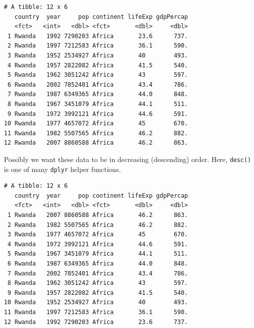 \documentclass[]{krantz}
\makeatletter
\newenvironment{Shaded}{\begin{snugshade}}{\end{snugshade}}
\newcommand{\KeywordTok}[1]{\textcolor[rgb]{0.27,0.27,0.27}{\textbf{#1}}}
\newcommand{\StringTok}[1]{\textcolor[rgb]{0.5,0.5,0.5}{#1}}
\newcommand{\OperatorTok}[1]{\textcolor[rgb]{0.43,0.43,0.43}{\textbf{#1}}}
\newcommand{\NormalTok}[1]{#1}
\newenvironment{kframe}{%
\medskip{}
\setlength{\fboxsep}{.8em}
 \def\at@end@of@kframe{}%
 \ifinner\ifhmode%
  \def\at@end@of@kframe{\end{minipage}}%
  \begin{minipage}{\columnwidth}%
 \fi\fi%
 \def\FrameCommand##1{\hskip\@totalleftmargin \hskip-\fboxsep
 \colorbox{shadecolor}{##1}\hskip-\fboxsep
     \hskip-\linewidth \hskip-\@totalleftmargin \hskip\columnwidth}%
 \MakeFramed {\advance\hsize-\width
   \@totalleftmargin\z@ \linewidth\hsize
   \@setminipage}}%
 {\par\unskip\endMakeFramed%
 \at@end@of@kframe}
\renewenvironment{Shaded}{\begin{kframe}}{\end{kframe}}
\makeatother
\begin{document}
\begin{Shaded}
\end{Shaded}

\begin{verbatim}
# A tibble: 12 x 6
   country  year     pop continent lifeExp gdpPercap
   <fct>   <int>   <dbl> <fct>       <dbl>     <dbl>
 1 Rwanda   1992 7290203 Africa       23.6      737.
 2 Rwanda   1997 7212583 Africa       36.1      590.
 3 Rwanda   1952 2534927 Africa       40        493.
 4 Rwanda   1957 2822082 Africa       41.5      540.
 5 Rwanda   1962 3051242 Africa       43        597.
 6 Rwanda   2002 7852401 Africa       43.4      786.
 7 Rwanda   1987 6349365 Africa       44.0      848.
 8 Rwanda   1967 3451079 Africa       44.1      511.
 9 Rwanda   1972 3992121 Africa       44.6      591.
10 Rwanda   1977 4657072 Africa       45        670.
11 Rwanda   1982 5507565 Africa       46.2      882.
12 Rwanda   2007 8860588 Africa       46.2      863.
\end{verbatim}

Possibly we want these data to be in decreasing (descending) order.
Here, \texttt{desc()} is one of many \texttt{dplyr} helper functions.

\begin{Shaded}
\end{Shaded}

\begin{verbatim}
# A tibble: 12 x 6
   country  year     pop continent lifeExp gdpPercap
   <fct>   <int>   <dbl> <fct>       <dbl>     <dbl>
 1 Rwanda   2007 8860588 Africa       46.2      863.
 2 Rwanda   1982 5507565 Africa       46.2      882.
 3 Rwanda   1977 4657072 Africa       45        670.
 4 Rwanda   1972 3992121 Africa       44.6      591.
 5 Rwanda   1967 3451079 Africa       44.1      511.
 6 Rwanda   1987 6349365 Africa       44.0      848.
 7 Rwanda   2002 7852401 Africa       43.4      786.
 8 Rwanda   1962 3051242 Africa       43        597.
 9 Rwanda   1957 2822082 Africa       41.5      540.
10 Rwanda   1952 2534927 Africa       40        493.
11 Rwanda   1997 7212583 Africa       36.1      590.
12 Rwanda   1992 7290203 Africa       23.6      737.
\end{verbatim}
\end{document}
